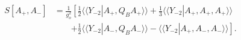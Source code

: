 \begin{equation}
\begin{split}
S[A_+,A_-]&=\frac{1}{g^2_o}\left[ \frac{1}{2}\langle\!\langle
Y_{-2}|A_+,Q_BA_+ \rangle\!\rangle+\frac{1}{3}\langle\!\langle
Y_{-2}|A_+,A_+,A_+\rangle\!\rangle
\right.\\
&~~~~~~~~~\left.+\frac{1}{2}\langle\!\langle
Y_{-2}|A_-,Q_BA_-\rangle\!\rangle -\langle\!\langle
Y_{-2}|A_+,A_-,A_-\rangle\!\rangle\right].
\end{split}
\label{action7}
\end{equation}

